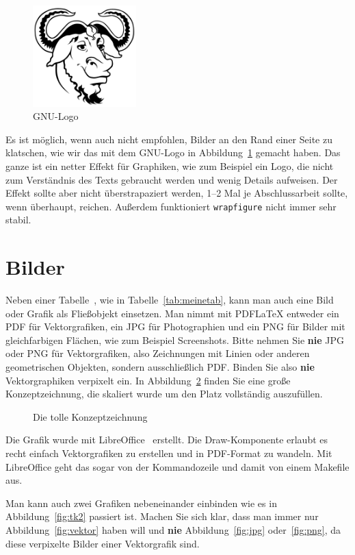 \documentclass[11pt,a4paper]{report}
\begin{document}
\begin{figure}
  \centering
  \includegraphics[width=4cm]{images/gnu}
  \caption{GNU-Logo~\cite{images/gnulogo,fal}}
  \label{fig:gnu}
\end{figure}
Es ist möglich, wenn auch nicht empfohlen, 
Bilder an den 
Rand einer Seite zu klatschen, wie wir das mit dem 
GNU-Logo in Abbildung~\ref{fig:gnu} gemacht haben. 
Das ganze ist ein netter Effekt für Graphiken, wie zum Beispiel ein
Logo, die nicht zum Verständnis des Texts gebraucht werden und wenig
Details aufweisen. 
Der Effekt sollte aber nicht überstrapaziert werden, 1--2 Mal 
je Abschlussarbeit sollte, wenn überhaupt, rei\-chen.
Außerdem funktioniert \verb|wrapfigure| nicht immer sehr stabil.

\section{Bilder}

Neben einer Tabelle~\cite{kopka}, wie in Tabelle~\ref{tab:meinetab},
kann man auch eine Bild oder Grafik als Fließobjekt einsetzen.
Man nimmt mit PDFLaTeX entweder ein PDF für Vektorgrafiken,
ein JPG für Photographien und ein PNG für Bilder mit gleichfarbigen
Flächen, wie zum Beispiel Screenshots.
Bitte nehmen Sie \textbf{nie} JPG oder PNG für Vektorgrafiken, 
also Zeichnungen mit Linien oder anderen geometrischen Objekten,
sondern ausschließlich PDF.
Binden Sie also \textbf{nie} Vektorgraphiken verpixelt ein.
In Abbildung~\ref{fig:tk} finden Sie eine große Konzeptzeichnung, 
die skaliert wurde um den Platz vollständig auszufüllen. 
\begin{figure}[htb]
\centering
\caption{Die tolle Konzeptzeichnung}
\label{fig:tk}
\end{figure}
Die Grafik wurde mit LibreOffice~\cite{libreoffice} erstellt. 
Die Draw-Komponente erlaubt es recht einfach Vektorgrafiken zu 
erstellen und in PDF-Format zu wandeln. 
Mit LibreOffice geht das sogar von der Kommandozeile und damit
von einem Makefile aus.

Man kann auch zwei Grafiken nebeneinander einbinden wie es in 
Abbildung~\ref{fig:tk2} passiert ist. 
Machen Sie sich klar, dass man immer nur Abbildung~\ref{fig:vektor}
haben will und \textbf{nie} 
Abbildung~\ref{fig:jpg} oder~\ref{fig:png}, 
da diese verpixelte Bilder einer Vektorgrafik sind.
\end{document}
